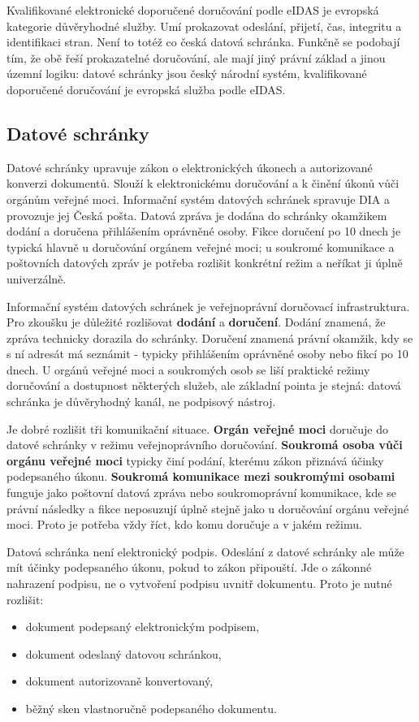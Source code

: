 Kvalifikované elektronické doporučené doručování podle eIDAS je evropská kategorie důvěryhodné služby. Umí prokazovat odeslání, přijetí, čas, integritu a identifikaci stran. Není to totéž co česká datová schránka. Funkčně se podobají tím, že obě řeší prokazatelné doručování, ale mají jiný právní základ a jinou územní logiku: datové schránky jsou český národní systém, kvalifikované doporučené doručování je evropská služba podle eIDAS.

\subsection*{Datové schránky}
Datové schránky upravuje zákon o elektronických úkonech a autorizované konverzi dokumentů. Slouží k elektronickému doručování a k činění úkonů vůči orgánům veřejné moci. Informační systém datových schránek spravuje DIA a provozuje jej Česká pošta. Datová zpráva je dodána do schránky okamžikem dodání a doručena přihlášením oprávněné osoby. Fikce doručení po 10 dnech je typická hlavně u doručování orgánem veřejné moci; u soukromé komunikace a poštovních datových zpráv je potřeba rozlišit konkrétní režim a neříkat ji úplně univerzálně.

Informační systém datových schránek je veřejnoprávní doručovací infrastruktura. Pro zkoušku je důležité rozlišovat \textbf{dodání} a \textbf{doručení}. Dodání znamená, že zpráva technicky dorazila do schránky. Doručení znamená právní okamžik, kdy se s ní adresát má seznámit - typicky přihlášením oprávněné osoby nebo fikcí po 10 dnech. U orgánů veřejné moci a soukromých osob se liší praktické režimy doručování a dostupnost některých služeb, ale základní pointa je stejná: datová schránka je důvěryhodný kanál, ne podpisový nástroj.

Je dobré rozlišit tři komunikační situace. \textbf{Orgán veřejné moci} doručuje do datové schránky v režimu veřejnoprávního doručování. \textbf{Soukromá osoba vůči orgánu veřejné moci} typicky činí podání, kterému zákon přiznává účinky podepsaného úkonu. \textbf{Soukromá komunikace mezi soukromými osobami} funguje jako poštovní datová zpráva nebo soukromoprávní komunikace, kde se právní následky a fikce neposuzují úplně stejně jako u doručování orgánu veřejné moci. Proto je potřeba vždy říct, kdo komu doručuje a v jakém režimu.

Datová schránka není elektronický podpis. Odeslání z datové schránky ale může mít účinky podepsaného úkonu, pokud to zákon připouští. Jde o zákonné nahrazení podpisu, ne o vytvoření podpisu uvnitř dokumentu. Proto je nutné rozlišit:
\begin{itemize}
  \item dokument podepsaný elektronickým podpisem,
  \item dokument odeslaný datovou schránkou,
  \item dokument autorizovaně konvertovaný,
  \item běžný sken vlastnoručně podepsaného dokumentu.
\end{itemize}

